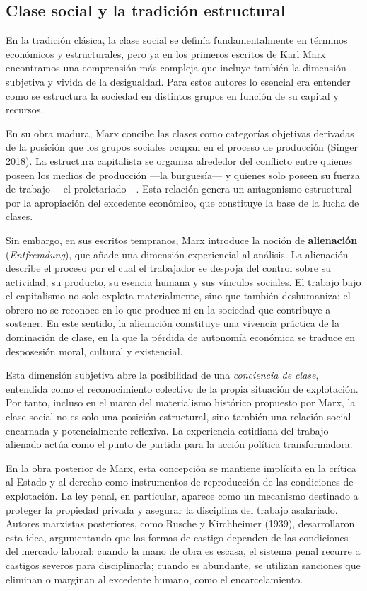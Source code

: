 \documentclass[
  spanish,
  letterpaper,
  DIV=11,
  numbers=noendperiod]{scrreprt}
\begin{document}
\subsection{Clase social y la tradición
estructural}\label{clase-social-y-la-tradiciuxf3n-estructural}

En la tradición clásica, la clase social se definía fundamentalmente en
términos económicos y estructurales, pero ya en los primeros escritos de
Karl Marx encontramos una comprensión más compleja que incluye también
la dimensión subjetiva y vivida de la desigualdad. Para estos autores lo
esencial era entender como se estructura la sociedad en distintos grupos
en función de su capital y recursos.

En su obra madura, Marx concibe las clases como categorías objetivas
derivadas de la posición que los grupos sociales ocupan en el proceso de
producción (Singer 2018). La estructura capitalista se organiza
alrededor del conflicto entre quienes poseen los medios de producción
---la burguesía--- y quienes solo poseen su fuerza de trabajo ---el
proletariado---. Esta relación genera un antagonismo estructural por la
apropiación del excedente económico, que constituye la base de la lucha
de clases.

Sin embargo, en sus escritos tempranos, Marx introduce la noción de
\textbf{alienación} (\emph{Entfremdung}), que añade una dimensión
experiencial al análisis. La alienación describe el proceso por el cual
el trabajador se despoja del control sobre su actividad, su producto, su
esencia humana y sus vínculos sociales. El trabajo bajo el capitalismo
no solo explota materialmente, sino que también deshumaniza: el obrero
no se reconoce en lo que produce ni en la sociedad que contribuye a
sostener. En este sentido, la alienación constituye una vivencia
práctica de la dominación de clase, en la que la pérdida de autonomía
económica se traduce en desposesión moral, cultural y existencial.

Esta dimensión subjetiva abre la posibilidad de una \emph{conciencia de
clase}, entendida como el reconocimiento colectivo de la propia
situación de explotación. Por tanto, incluso en el marco del
materialismo histórico propuesto por Marx, la clase social no es solo
una posición estructural, sino también una relación social encarnada y
potencialmente reflexiva. La experiencia cotidiana del trabajo alienado
actúa como el punto de partida para la acción política transformadora.

En la obra posterior de Marx, esta concepción se mantiene implícita en
la crítica al Estado y al derecho como instrumentos de reproducción de
las condiciones de explotación. La ley penal, en particular, aparece
como un mecanismo destinado a proteger la propiedad privada y asegurar
la disciplina del trabajo asalariado. Autores marxistas posteriores,
como Rusche y Kirchheimer (1939), desarrollaron esta idea, argumentando
que las formas de castigo dependen de las condiciones del mercado
laboral: cuando la mano de obra es escasa, el sistema penal recurre a
castigos severos para disciplinarla; cuando es abundante, se utilizan
sanciones que eliminan o marginan al excedente humano, como el
encarcelamiento.
\end{document}
